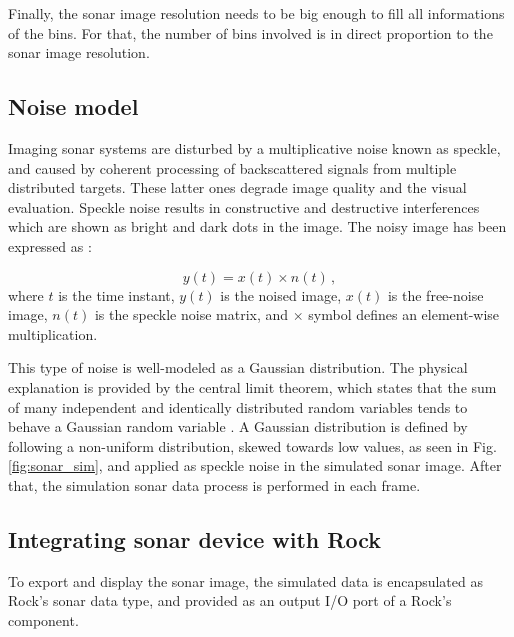 \documentclass[final,5p,times]{elsarticle}
\begin{document}
Finally, the sonar image resolution needs to be big enough to fill all
informations of the bins. For that, the number of bins involved is in direct
proportion to the sonar image resolution.


\subsection{Noise model}
\label{dev:noise}

Imaging sonar systems are disturbed by a multiplicative noise known as speckle,
and caused by coherent processing of backscattered signals from multiple
distributed targets. These latter ones degrade image quality and the visual
evaluation. Speckle noise results in constructive and destructive interferences
which are shown as bright and dark dots in the image. The noisy image has been
expressed as \cite{lee1980}:

\begin{equation}
\label{eq:2}
y(t) = x(t) \times n(t) \, ,
\end{equation}
where $t$ is the time instant, $y(t)$ is the noised image, $x(t)$ is the
free-noise image, $n(t)$ is the speckle noise matrix, and $\times$ symbol defines an
element-wise multiplication.

This type of noise is well-modeled as a Gaussian distribution. The physical
explanation is provided by the central limit theorem, which states that the
sum of many independent and identically distributed random variables tends
to behave a Gaussian random variable \textcolor{blue}{\cite{papoulis2002}}. A Gaussian distribution is defined
by following a non-uniform distribution, skewed towards low values, as seen
in Fig. \ref{fig:sonar_sim}, and applied as speckle noise in the simulated
sonar image. After that, the simulation sonar data process is performed in
each frame.

\subsection{Integrating sonar device with Rock}
\label{dev:rock}

To export and display the sonar image, the simulated data is encapsulated
as Rock's sonar data type, and provided as an output I/O port of a Rock's
component.

\end{document}
